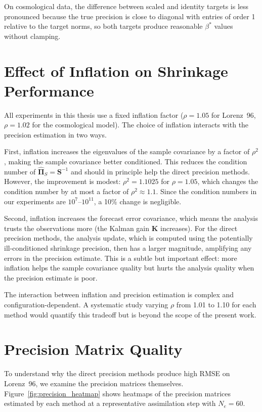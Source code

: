 On cosmological data, the difference between scaled and identity targets is less pronounced because the true precision is close to diagonal with entries of order 1 relative to the target norms, so both targets produce reasonable $\beta^*$ values without clamping.

\section{Effect of Inflation on Shrinkage Performance}
\label{sec:inflation_effect}

All experiments in this thesis use a fixed inflation factor ($\rho = 1.05$ for Lorenz~96, $\rho = 1.02$ for the cosmological model). The choice of inflation interacts with the precision estimation in two ways.

First, inflation increases the eigenvalues of the sample covariance by a factor of $\rho^2$, making the sample covariance better conditioned. This reduces the condition number of $\hat{\boldsymbol{\Pi}}_S = \mathbf{S}^{-1}$ and should in principle help the direct precision methods. However, the improvement is modest: $\rho^2 = 1.1025$ for $\rho = 1.05$, which changes the condition number by at most a factor of $\rho^2 \approx 1.1$. Since the condition numbers in our experiments are $10^7$--$10^{11}$, a 10\% change is negligible.

Second, inflation increases the forecast error covariance, which means the analysis trusts the observations more (the Kalman gain $\mathbf{K}$ increases). For the direct precision methods, the analysis update, which is computed using the potentially ill-conditioned shrinkage precision, then has a larger magnitude, amplifying any errors in the precision estimate. This is a subtle but important effect: more inflation helps the sample covariance quality but hurts the analysis quality when the precision estimate is poor.

The interaction between inflation and precision estimation is complex and configuration-dependent. A systematic study varying $\rho$ from 1.01 to 1.10 for each method would quantify this tradeoff but is beyond the scope of the present work.

\section{Precision Matrix Quality}
\label{sec:precision_quality_detail}

To understand why the direct precision methods produce high RMSE on Lorenz~96, we examine the precision matrices themselves. Figure~\ref{fig:precision_heatmap} shows heatmaps of the precision matrices estimated by each method at a representative assimilation step with $N_e = 60$.

